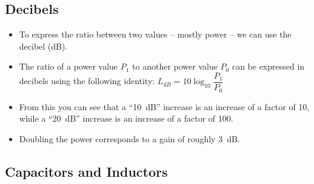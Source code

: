 \documentclass[letterpaper,12pt]{scrartcl}
\begin{document}
\subsection{Decibels}

\begin{itemize}
\item To express the ratio between two values -- mostly power -- we can use the decibel (dB).
\item The ratio of a power value $P_1$ to another power value $P_0$ can be expressed in decibels using the following identity:
$L_{dB} = 10 \log_{10} \dfrac{P_1}{P_0}$
\item From this you can see that a ``10~dB'' increase is an increase of a factor of 10, while a ``20~dB'' increase is an increase
of a factor of 100.
\item Doubling the power corresponds to a gain of roughly 3~dB.
\end{itemize}

\subsection{Capacitors and Inductors}
\end{document}
